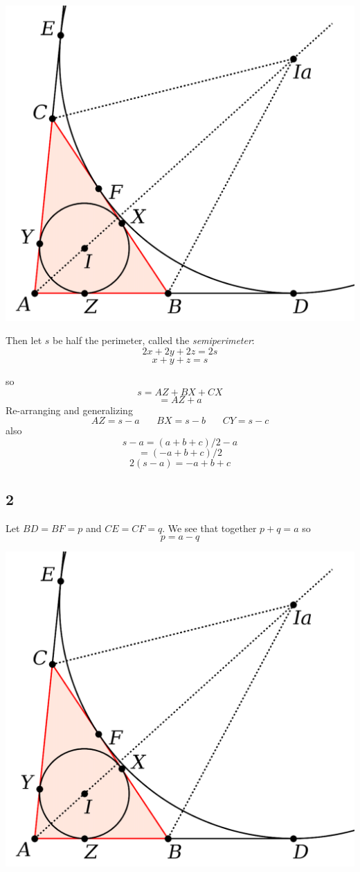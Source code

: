 \documentclass[11pt, oneside]{article}
\begin{document}
\begin{center} \includegraphics [scale=0.40] {excircle_crop1.png} \end{center}

Then let $s$ be half the perimeter, called the \emph{semiperimeter}:
\[ 2x + 2y + 2z = 2s \]
\[ x + y + z = s \]

so
\[ s = AZ + BX + CX \]
\[   = AZ + a \]
Re-arranging and generalizing 
\[ AZ = s-a \ \ \ \ \ \ \ \ BX = s-b \ \ \ \ \ \ \ \ CY = s-c \]
also
\[ s-a = (a+b+c)/2 - a \]
\[    = (-a+b+c)/2 \]
\[ 2(s-a) = -a+b+c \]

\subsection*{2}
Let 
$BD = BF = p$ and $CE = CF = q$.  We see that together $p + q = a$ so
\[ p = a - q \]

\begin{center} \includegraphics [scale=0.40] {excircle_crop1.png} \end{center}
\end{document}
